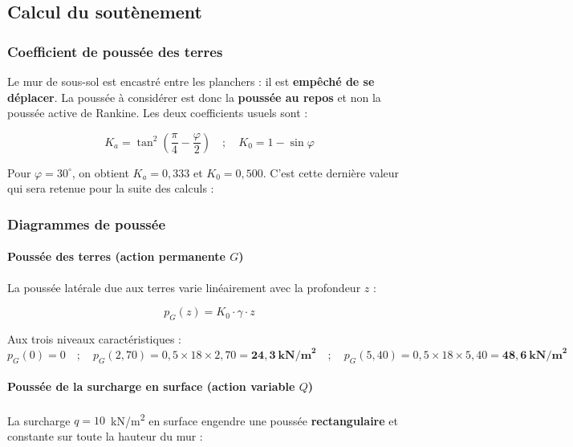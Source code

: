 \subsection{Calcul du soutènement}

\subsubsection{Coefficient de poussée des terres}

Le mur de sous-sol est encastré entre les planchers : il est \textbf{empêché de se déplacer}. La poussée à considérer est donc la \textbf{poussée au repos} et non la poussée active de Rankine. Les deux coefficients usuels sont :

\[
K_a = \tan^2\!\left(\frac{\pi}{4} - \frac{\varphi}{2}\right)
\quad ; \quad
K_0 = 1 - \sin \varphi
\]

Pour $\varphi = 30^\circ$, on obtient $K_a = 0{,}333$ et $K_0 = 0{,}500$. C'est cette dernière valeur qui sera retenue pour la suite des calculs :


\subsubsection{Diagrammes de poussée}

\paragraph{Poussée des terres (action permanente \texorpdfstring{$G$}{G})}

La poussée latérale due aux terres varie linéairement avec la profondeur $z$ :

\[
p_G(z) = K_0 \cdot \gamma \cdot z
\]

Aux trois niveaux caractéristiques :
\[
p_G(0) = 0 \quad ; \quad p_G(2{,}70) = 0{,}5 \times 18 \times 2{,}70 = \mathbf{24{,}3~\text{kN/m}^2} \quad ; \quad p_G(5{,}40) = 0{,}5 \times 18 \times 5{,}40 = \mathbf{48{,}6~\text{kN/m}^2}
\]

\paragraph{Poussée de la surcharge en surface (action variable \texorpdfstring{$Q$}{Q})}

La surcharge $q = 10$~kN/m\textsuperscript{2} en surface engendre une poussée \textbf{rectangulaire} et constante sur toute la hauteur du mur :

